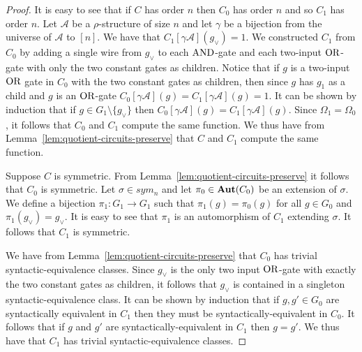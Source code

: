 \documentclass[../paper.tex]{subfiles}
\begin{document}
\begin{proof}


  It is easy to see that if $C$ has order $n$ then $C_0$ has order $n$ and so
  $C_1$ has order $n$. Let $\mathcal{A}$ be a $\rho$-structure of size $n$ and
  let $\gamma$ be a bijection from the universe of $\mathcal{A}$ to $[n]$. We
  have that $C_1[\gamma \mathcal{A}](g_\lor) = 1$. We constructed $C_1$ from
  $C_0$ by adding a single wire from $g_\lor$ to each $\text{\upshape AND}$-gate and each
  two-input $\text{\upshape OR}$-gate with only the two constant gates as children. Notice that
  if $g$ is a two-input $\text{\upshape OR}$ gate in $C_0$ with the two constant gates as
  children, then since $g$ has $g_1$ as a child and $g$ is an $\text{\upshape OR}$-gate
  $C_0[\gamma \mathcal{A}](g) = C_1[\gamma \mathcal{A}](g) = 1$. It can be shown
  by induction that if $g \in G_1 \setminus \{g_\lor\}$ then $C_0 [\gamma
  \mathcal{A}](g) = C_1[\gamma \mathcal{A}](g)$. Since $\Omega_1 = \Omega_0$, it
  follows that $C_0$ and $C_1$ compute the same function. We thus have from
  Lemma~\ref{lem:quotient-circuits-preserve} that $C$ and $C_1$ compute the same
  function.

  Suppose $C$ is symmetric. From Lemma~\ref{lem:quotient-circuits-preserve} it
  follows that $C_0$ is symmetric. Let $\sigma \in sym_n$ and let $\pi_0 \in
  \text{\textbf{Aut}}(C_0)$ be an extension of $\sigma$. We define a bijection $\pi_1 : G_1
  \rightarrow G_1$ such that $\pi_1 (g) = \pi_0(g)$ for all $g \in G_0$ and
  $\pi_1 (g_\lor) = g_\lor$. It is easy to see that $\pi_1$ is an automorphism
  of $C_1$ extending $\sigma$. It follows that $C_1$ is symmetric.

  We have from Lemma~\ref{lem:quotient-circuits-preserve} that $C_0$ has trivial
  syntactic-equivalence classes. Since $g_\lor$ is the only two input $\text{\upshape OR}$-gate
  with exactly the two constant gates as children, it follows that $g_\lor$ is
  contained in a singleton syntactic-equivalence class. It can be shown by
  induction that if $g, g' \in G_0$ are syntactically equivalent in $C_1$ then
  they must be syntactically-equivalent in $C_0$. It follows that if $g$ and
  $g'$ are syntactically-equivalent in $C_1$ then $g = g'$. We thus have that
  $C_1$ has trivial syntactic-equivalence classes.


\end{proof}
\end{document}
